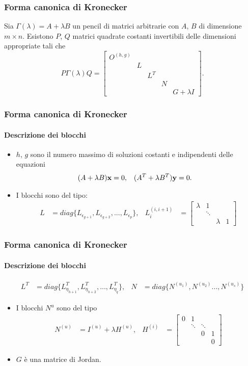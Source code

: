 \begin{frame}
	\frametitle{Forma canonica di Kronecker}
	\begin{theorem}
		Sia \(\Gamma(\lambda) = A + \lambda B\) un pencil di matrici arbitrarie con
		$A$, $B$ di dimensione \(m \times n\). Esistono $P$, $Q$
		matrici quadrate costanti invertibili delle dimensioni appropriate tali che
		\[
			P\Gamma(\lambda)Q = \begin{bmatrix}
				O^{(h, g)} \\
				& L \\
				&& L^T \\
				&&& N \\
				&&&& G+\lambda I
			\end{bmatrix}.
		\]
	\end{theorem}
\end{frame}


\begin{frame}
	\frametitle{Forma canonica di Kronecker}
	\framesubtitle{Descrizione dei blocchi}
	\begin{itemize}
		\item $h$, $g$ sono il numero massimo di soluzioni costanti e indipendenti delle
		equazioni
		\begin{align*}
			(A + \lambda B)\vb{x} &= 0, & (A^T + \lambda B^T)\vb{y} &= 0.
		\end{align*}
		\item {} I blocchi sono del tipo:
		\begin{align*}
			L &= diag\{L_{\epsilon_{g+1}}, L_{\epsilon_{g+2}}, ..., L_{\epsilon_{p}}\},
			&
			L_{i}^{(i, i+1)} &= \begin{bmatrix}
				\lambda & 1 \\
				& \ddots \\
				& & \lambda & 1
			\end{bmatrix}
		\end{align*}
	\end{itemize}
\end{frame}


\begin{frame}
	\frametitle{Forma canonica di Kronecker}
	\framesubtitle{Descrizione dei blocchi}
	\begin{align*}
		L^T &= diag\{L_{\eta_{h+1}}^T, L_{\eta_{h+2}}^T, ..., L_{\eta_{q}}^T\},
		&
		N &= diag\{N^{(u_{1})}, N^{(u_{2})} ..., N^{(u_{s})}\}
	\end{align*}
	\begin{itemize}
		\item {} I blocchi $N^{u}$ sono del tipo
		\begin{align*}
			N^{(u)} &= I^{(u)} + \lambda H^{(u)}, &
			H^{(i)} &= \begin{bmatrix}
				0 & 1 \\
				& \ddots & \ddots \\
				& & 0 & 1 \\
				& & & 0
			\end{bmatrix}
		\end{align*}
		\item {} $G$ \`e una matrice di Jordan.
	\end{itemize}
\end{frame}


